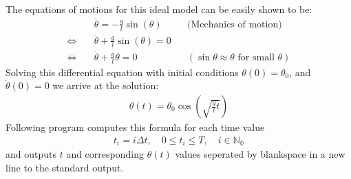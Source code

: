 \documentclass[a4paper,10pt,english]{jupyterBook}
\begin{document}
\sphinxAtStartPar
The equations of motions for this ideal model can be easily shown to be:
\begin{align*}
&\ddot{\theta} = -\frac{g}{l}\sin(\theta) \quad 
&&\text{(Mechanics of motion)} \\
\Leftrightarrow \quad &\ddot{\theta} + \frac{g}{l}\sin(\theta) = 0 && \\
\Leftrightarrow \quad &\ddot{\theta} + \frac{g}{l}\theta = 0 
&& (\sin{\theta}\approx\theta \text{ for small } \theta)
\end{align*}
\sphinxAtStartPar
Solving this differential equation with initial conditions \(\theta(0) = \theta_{0}\), and \(\dot{\theta}(0) = 0\) we arrive at the solution:
\begin{equation*}
\begin{split}
\theta(t) = \theta_{0}\cos(\sqrt{\frac{g}{l}t})
\end{split}
\end{equation*}
\sphinxAtStartPar
Following program computes this formula for each time value
\begin{equation*}
\begin{split}
t_{i} = i\Delta t, \quad 0 \leq t_{i} \leq T, \quad i \in \mathbb{N_{0}}
\end{split}
\end{equation*}
\sphinxAtStartPar
and outputs \(t\) and corresponding \(\theta(t)\) values seperated by blankspace in a new line to the standard output.
\end{document}
